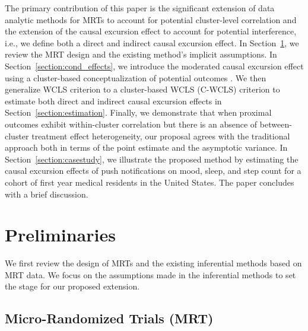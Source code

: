 \documentclass[12pt]{article}
\begin{document}
The primary contribution of this paper is the significant extension of data analytic methods for MRTs to account for potential cluster-level correlation and the extension of the causal excursion effect to account for potential interference, i.e., we define both a direct and indirect causal excursion effect.  In Section~\ref{section:preliminaries}, we review the MRT design and the existing method's implicit assumptions.  In Section~\ref{section:cond_effects}, we introduce the moderated causal excursion effect using a cluster-based conceptualization of potential outcomes \citep{Hong2006,Vanderweele2013}.  We then generalize WCLS criterion to a cluster-based WCLS (C-WCLS) criterion to estimate both direct and indirect causal excursion effects in Section~\ref{section:estimation}.  Finally, we demonstrate that when proximal outcomes exhibit within-cluster correlation but there is an absence of between-cluster treatment effect heterogeneity, our proposal agrees with the traditional approach both in terms of the point estimate and the asymptotic variance.  In Section~\ref{section:casestudy}, we illustrate the proposed method by estimating the causal excursion effects of push notifications on mood, sleep, and step count for a cohort of first year medical residents in the United States. The paper concludes with a brief discussion.

\section{Preliminaries}
\label{section:preliminaries}

We first review the design of MRTs and the existing inferential methods based on MRT data. We focus on the assumptions made in the inferential methods to set the stage for our proposed extension.

\subsection{Micro-Randomized Trials (MRT)}
\end{document}
